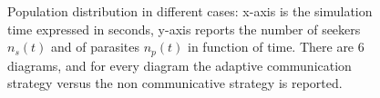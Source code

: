 \begin{figure}[htbp]
\begin{center}
      \vspace{1pt}
	\hspace{1pt}
    \caption[Sub system formation in different conditions]{
	  Population distribution in different cases: x-axis is the simulation time expressed in seconds,
	  y-axis reports the number of seekers $n_{s}(t)$ and of parasites $n_{p}(t)$ in function of time.
	  There are 6 diagrams, and for every diagram the adaptive communication
	  strategy versus the non communicative strategy is reported. \label{fig:generalcomparison}}
  \end{center}
\end{figure}


